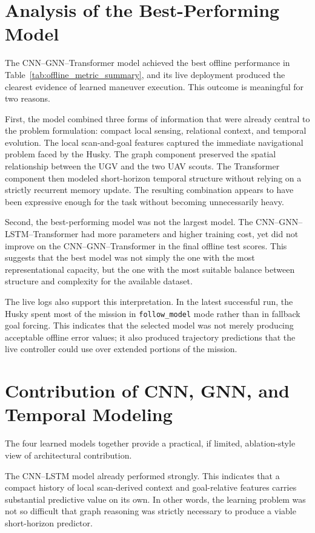 \section{Analysis of the Best-Performing Model}

The CNN--GNN--Transformer model achieved the best offline performance in Table~\ref{tab:offline_metric_summary}, and its live deployment produced the clearest evidence of learned maneuver execution. This outcome is meaningful for two reasons.

First, the model combined three forms of information that were already central to the problem formulation: compact local sensing, relational context, and temporal evolution. The local scan-and-goal features captured the immediate navigational problem faced by the Husky. The graph component preserved the spatial relationship between the UGV and the two UAV scouts. The Transformer component then modeled short-horizon temporal structure without relying on a strictly recurrent memory update. The resulting combination appears to have been expressive enough for the task without becoming unnecessarily heavy.

Second, the best-performing model was not the largest model. The CNN--GNN--LSTM--Transformer had more parameters and higher training cost, yet did not improve on the CNN--GNN--Transformer in the final offline test scores. This suggests that the best model was not simply the one with the most representational capacity, but the one with the most suitable balance between structure and complexity for the available dataset.

The live logs also support this interpretation. In the latest successful run, the Husky spent most of the mission in \texttt{follow\_model} mode rather than in fallback goal forcing. This indicates that the selected model was not merely producing acceptable offline error values; it also produced trajectory predictions that the live controller could use over extended portions of the mission.

\section{Contribution of CNN, GNN, and Temporal Modeling}

The four learned models together provide a practical, if limited, ablation-style view of architectural contribution.

The CNN--LSTM model already performed strongly. This indicates that a compact history of local scan-derived context and goal-relative features carries substantial predictive value on its own. In other words, the learning problem was not so difficult that graph reasoning was strictly necessary to produce a viable short-horizon predictor.

